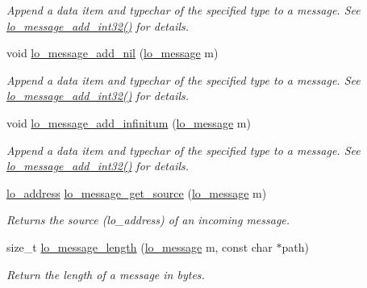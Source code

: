 \begin{CompactItemize}
\begin{CompactList}\small\item\em Append a data item and typechar of the specified type to a message. See \hyperlink{group__liblolowlevel_g31ac1e4c0ec6c61f665ce3f9bbdc53c3}{lo\_\-message\_\-add\_\-int32()} for details. \item\end{CompactList}\item 
void \hyperlink{group__liblolowlevel_gc5061d92c52c03b9d23eff012cc1b496}{lo\_\-message\_\-add\_\-nil} (\hyperlink{lo__types_8h_d126083c98d941f00eb72d1690b38d63}{lo\_\-message} m)
\begin{CompactList}\small\item\em Append a data item and typechar of the specified type to a message. See \hyperlink{group__liblolowlevel_g31ac1e4c0ec6c61f665ce3f9bbdc53c3}{lo\_\-message\_\-add\_\-int32()} for details. \item\end{CompactList}\item 
void \hyperlink{group__liblolowlevel_g826a762ee506b7f95fd27aadae82d56d}{lo\_\-message\_\-add\_\-infinitum} (\hyperlink{lo__types_8h_d126083c98d941f00eb72d1690b38d63}{lo\_\-message} m)
\begin{CompactList}\small\item\em Append a data item and typechar of the specified type to a message. See \hyperlink{group__liblolowlevel_g31ac1e4c0ec6c61f665ce3f9bbdc53c3}{lo\_\-message\_\-add\_\-int32()} for details. \item\end{CompactList}\item 
\hyperlink{lo__types_8h_bf9b53223467de596b89e1377b0f3f3d}{lo\_\-address} \hyperlink{group__liblolowlevel_g1f4e07e4f8b67edc98f4b300412a3dbb}{lo\_\-message\_\-get\_\-source} (\hyperlink{lo__types_8h_d126083c98d941f00eb72d1690b38d63}{lo\_\-message} m)
\begin{CompactList}\small\item\em Returns the source (lo\_\-address) of an incoming message. \item\end{CompactList}\item 
size\_\-t \hyperlink{group__liblolowlevel_g0855039d071b7031727213272857c27e}{lo\_\-message\_\-length} (\hyperlink{lo__types_8h_d126083c98d941f00eb72d1690b38d63}{lo\_\-message} m, const char $\ast$path)
\begin{CompactList}\small\item\em Return the length of a message in bytes. \item\end{CompactList}\item 

\end{CompactItemize}
